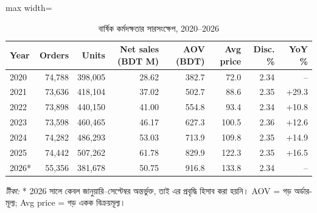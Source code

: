 \begin{table}[htbp]
\centering
\small
\caption{বার্ষিক কর্মদক্ষতার সারসংক্ষেপ, 2020--2026}
\label{tab:annual}
\begin{adjustbox}{max width=\linewidth}
\begin{tabular}{lrrrrrrr}
\toprule
\textbf{Year} & \textbf{Orders} & \textbf{Units} & \textbf{Net sales (BDT M)} & \textbf{AOV (BDT)} & \textbf{Avg price} & \textbf{Disc. \%} & \textbf{YoY \%} \\
\midrule
2020 & 74,788 & 398,005 & 28.62 & 382.7 & 72.0 & 2.34 & -- \\
2021 & 73,636 & 418,104 & 37.02 & 502.7 & 88.6 & 2.35 & +29.3 \\
2022 & 73,898 & 440,150 & 41.00 & 554.8 & 93.4 & 2.34 & +10.8 \\
2023 & 73,598 & 460,465 & 46.17 & 627.3 & 100.5 & 2.36 & +12.6 \\
2024 & 74,282 & 486,293 & 53.03 & 713.9 & 109.8 & 2.35 & +14.9 \\
2025 & 74,442 & 507,262 & 61.78 & 829.9 & 122.3 & 2.35 & +16.5 \\
2026* & 55,356 & 381,678 & 50.75 & 916.8 & 133.8 & 2.34 & -- \\
\bottomrule
\end{tabular}
\end{adjustbox}
\par\smallskip\parbox{0.92\linewidth}{\footnotesize\emph{টীকা:} * 2026 সালে কেবল জানুয়ারি--সেপ্টেম্বর অন্তর্ভুক্ত, তাই এর প্রবৃদ্ধি হিসাব করা হয়নি। AOV = গড় অর্ডার-মূল্য; Avg price = গড় একক বিক্রয়মূল্য।}
\end{table}